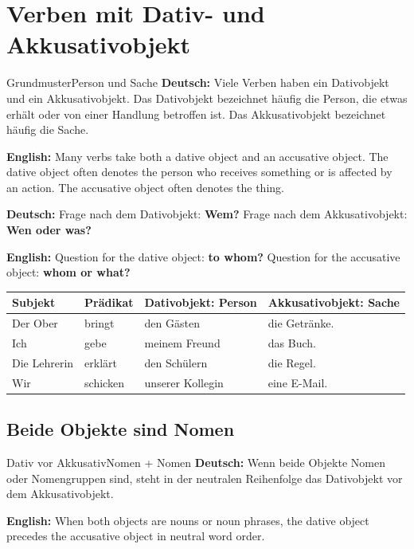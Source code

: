 \documentclass[a4paper,11pt]{article}
\newcommand{\GermanText}[1]{\textbf{Deutsch: }#1\par}
\newcommand{\EnglishText}[1]{{\small\color{SoftGray}\textbf{English: }#1\par}}
\newcommand{\TableHeader}[1]{\color{white}\textbf{#1}}
\begin{document}
    
    \section{Verben mit Dativ- und Akkusativobjekt}
        
        \begin{grammarentry}{Grundmuster}{Person und Sache}
            \GermanText{Viele Verben haben ein Dativobjekt und ein Akkusativobjekt. Das Dativobjekt bezeichnet häufig die Person, die etwas erhält oder von einer Handlung betroffen ist. Das Akkusativobjekt bezeichnet häufig die Sache.}
            \EnglishText{Many verbs take both a dative object and an accusative object. The dative object often denotes the person who receives something or is affected by an action. The accusative object often denotes the thing.}
            
            \GermanText{Frage nach dem Dativobjekt: \textbf{Wem?} \quad Frage nach dem Akkusativobjekt: \textbf{Wen oder was?}}
            \EnglishText{Question for the dative object: \textbf{to whom?} \quad Question for the accusative object: \textbf{whom or what?}}
        \end{grammarentry}
        
        \begin{longtable}{|p{2.4cm}|p{2.5cm}|p{4.1cm}|p{4.3cm}|}
            \hline
            \rowcolor{HeaderBlueDark}
            \TableHeader{Subjekt} & \TableHeader{Prädikat} & \TableHeader{Dativobjekt: Person} & \TableHeader{Akkusativobjekt: Sache} \\
            \hline
            Der Ober & bringt & den Gästen & die Getränke. \\
            \hline
            Ich & gebe & meinem Freund & das Buch. \\
            \hline
            Die Lehrerin & erklärt & den Schülern & die Regel. \\
            \hline
            Wir & schicken & unserer Kollegin & eine E-Mail. \\
            \hline
        \end{longtable}
        
        \subsection{Beide Objekte sind Nomen}
            
            \begin{grammarentry}{Dativ vor Akkusativ}{Nomen + Nomen}
                \GermanText{Wenn beide Objekte Nomen oder Nomengruppen sind, steht in der neutralen Reihenfolge das Dativobjekt vor dem Akkusativobjekt.}
                \EnglishText{When both objects are nouns or noun phrases, the dative object precedes the accusative object in neutral word order.}
            \end{grammarentry}
            
\end{document}
